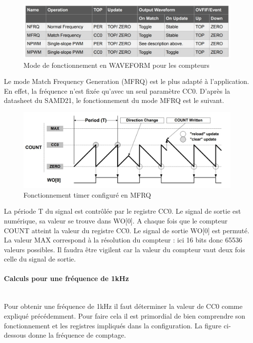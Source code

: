 \documentclass[a4paper]{article}
\begin{document}
	\begin{figure}[H]
		\centering
		\includegraphics[width=0.9\linewidth]{mode Waveform.jpg}
		\caption{Mode de fonctionnement en WAVEFORM pour les compteurs}
	\end{figure}
	
	Le mode Match Frequency Generation (MFRQ) est le plus adapté à l'application. En effet, la fréquence n'est fixée qu'avec un seul paramètre CC0. D'après la datasheet du SAMD21, le fonctionnement du mode MFRQ est le suivant. \\
	
	\begin{figure}[H]
		\centering
		\includegraphics[width=0.9\linewidth]{Match Frequency Operation.jpg}
		\caption{Fonctionnement timer configuré en MFRQ}
	\end{figure}
	La période T du signal est contrôlée par le registre CC0. Le signal de sortie est numérique, sa valeur se trouve dans WO[0]. A chaque fois que le compteur COUNT atteint la valeur du registre CC0.  Le signal de sortie WO[0] est permuté. La valeur MAX correspond à la résolution du compteur : ici 16 bits donc 65536 valeurs possibles. Il faudra être vigilent car la valeur du compteur vaut deux fois celle du signal de sortie.\\
	
	\paragraph{Calculs pour une fréquence de 1kHz}
	~~\\
	Pour obtenir une fréquence de 1kHz il faut déterminer la valeur de CC0 comme expliqué précédemment. Pour faire cela il est primordial de bien comprendre son fonctionnement et les registres impliqués dans la configuration. La figure ci-dessous donne la fréquence de comptage. \\
	
\end{document}
